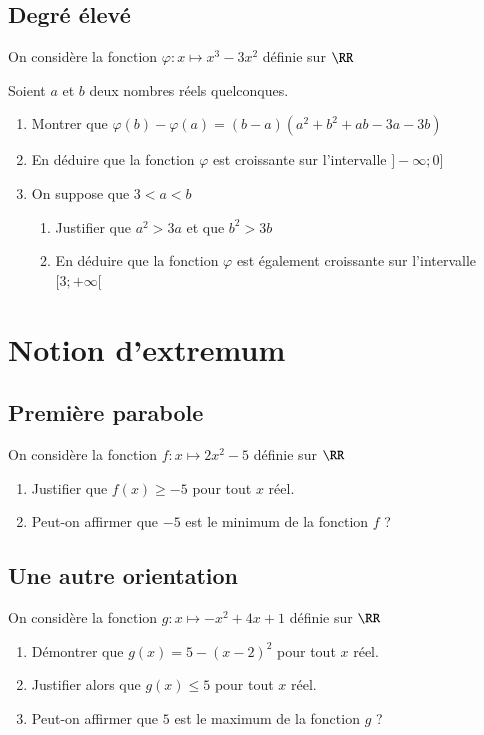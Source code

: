 \documentclass[oneside,12pt]{article}          %
\begin{document}
\subsection{Degré élevé}
On considère la fonction $\varphi:x\mapsto x^3-3x^2$ définie sur $\RR$

Soient $a$ et $b$ deux nombres réels quelconques.
\begin{enumerate}
	\item Montrer que $\varphi(b)-\varphi(a)=(b-a)(a^2+b^2+ab-3a-3b)$
	\item En déduire que la fonction $\varphi$ est croissante sur l'intervalle $]-\infty;0]$
	\item On suppose que $3<a<b$
	\begin{enumerate}
		\item Justifier que $a^2>3a$ et que $b^2>3b$
		\item En déduire que la fonction $\varphi$ est également croissante sur l'intervalle $[3;+\infty[$
	\end{enumerate}
\end{enumerate}



\section{Notion d'extremum}

\subsection{Première parabole}
On considère la fonction $f:x\mapsto 2x^2-5$ définie sur $\RR$
\begin{enumerate}
	\item Justifier que $f(x)\geq-5$ \quad pour tout $x$ réel.
	\item Peut-on affirmer que $-5$ est le minimum de la fonction $f$ ?
\end{enumerate}



\subsection{Une autre orientation}
On considère la fonction $g:x\mapsto -x^2+4x+1$ définie sur $\RR$
\begin{enumerate}
	\item Démontrer que $g(x)=5-(x-2)^2$ \quad pour tout $x$ réel.
	\item Justifier alors que $g(x)\leq5$ \quad pour tout $x$ réel.
	\item Peut-on affirmer que $5$ est le maximum de la fonction $g$ ?
\end{enumerate}
\end{document}
